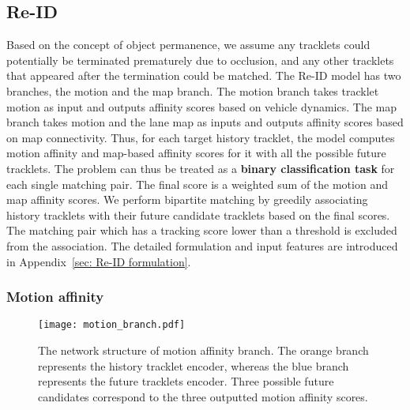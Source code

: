 \documentclass{article} \usepackage{iclr2023_conference,times}
\begin{document}
\vspace{-1mm}
\subsection{Re-ID}
\label{sec: Re-ID}
\vspace{-1mm}
Based on the concept of object permanence, we assume any tracklets could potentially be terminated prematurely due to occlusion, and any other tracklets that appeared after the termination could be matched. The Re-ID model has two branches, the motion and the map branch. The motion branch takes tracklet motion as input and outputs affinity scores based on vehicle dynamics. The map branch takes motion and the lane map as inputs and outputs affinity scores based on map connectivity. Thus, for each target history tracklet, the model computes motion affinity and map-based affinity scores for it with all the possible future tracklets. The problem can thus be treated as a \textbf{binary classification task} for each single matching pair. The final score is a weighted sum of the motion and map affinity scores. We perform bipartite matching by greedily associating history tracklets with their future candidate tracklets based on the final scores. The matching pair which has a tracking score lower than a threshold is excluded from the association. The detailed formulation and input features are introduced in Appendix~\ref{sec: Re-ID formulation}.
\vspace{-1mm}
\subsubsection{Motion affinity}
\label{sec: motion affinity}
\vspace{-1mm}

\begin{figure}
    \vspace{-4mm}
    \centering
    \texttt{[image: motion\_branch.pdf]}
    \caption{The network structure of motion affinity branch. The orange branch represents the history tracklet encoder, whereas the blue branch represents the future tracklets encoder. Three possible future candidates correspond to the three outputted motion affinity scores.}
    \label{fig: motion branch}
\end{figure}
\end{document}
